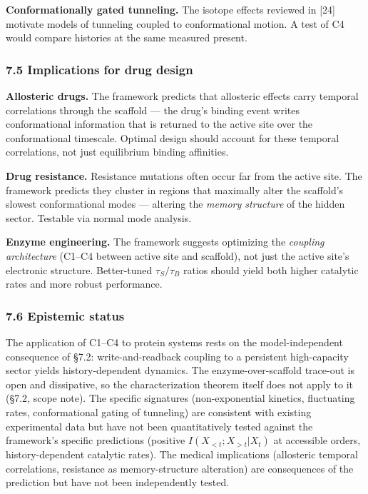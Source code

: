 \documentclass[
]{article}
\begin{document}
\textbf{Conformationally gated tunneling.} The isotope effects reviewed
in {[}24{]} motivate models of tunneling coupled to conformational
motion. A test of C4 would compare histories at the same measured
present.

\hypertarget{implications-for-drug-design}{%
\subsubsection{7.5 Implications for drug
design}\label{implications-for-drug-design}}

\textbf{Allosteric drugs.} The framework predicts that allosteric
effects carry temporal correlations through the scaffold --- the drug's
binding event writes conformational information that is returned to the
active site over the conformational timescale. Optimal design should
account for these temporal correlations, not just equilibrium binding
affinities.

\textbf{Drug resistance.} Resistance mutations often occur far from the
active site. The framework predicts they cluster in regions that
maximally alter the scaffold's slowest conformational modes --- altering
the \emph{memory structure} of the hidden sector. Testable via normal
mode analysis.

\textbf{Enzyme engineering.} The framework suggests optimizing the
\emph{coupling architecture} (C1--C4 between active site and scaffold),
not just the active site's electronic structure. Better-tuned
\(\tau_S / \tau_B\) ratios should yield both higher catalytic rates and
more robust performance.

\hypertarget{epistemic-status}{%
\subsubsection{7.6 Epistemic status}\label{epistemic-status}}

The application of C1--C4 to protein systems rests on the
model-independent consequence of §7.2: write-and-readback coupling to a
persistent high-capacity sector yields history-dependent dynamics. The
enzyme-over-scaffold trace-out is open and dissipative, so the
characterization theorem itself does not apply to it (§7.2, scope note).
The specific signatures (non-exponential kinetics, fluctuating rates,
conformational gating of tunneling) are consistent with existing
experimental data but have not been quantitatively tested against the
framework's specific predictions (positive \(I(X_{<t}; X_{>t} | X_t)\)
at accessible orders, history-dependent catalytic rates). The medical
implications (allosteric temporal correlations, resistance as
memory-structure alteration) are consequences of the prediction but have
not been independently tested.
\end{document}
